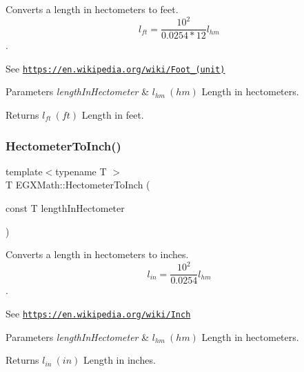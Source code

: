 Converts a length in hectometers to feet. \[ l_{ft}= \frac{10^{2}}{0.0254 * 12} l_{hm} \]. 

See \href{https://en.wikipedia.org/wiki/Foot_(unit)}{\tt https\+://en.\+wikipedia.\+org/wiki/\+Foot\+\_\+(unit)} 
\begin{DoxyParams}{Parameters}
{\em length\+In\+Hectometer} & $ l_{hm}\ (hm)$ Length in hectometers. \\
\hline
\end{DoxyParams}
\begin{DoxyReturn}{Returns}
$ l_{ft}\ (ft)$ Length in feet. 
\end{DoxyReturn}
\mbox{\label{group___e_g_x_math-_conversions-_length_conversions-_hectometer-_imperial_ga21fd4a7228c229b0b229fd0fab224998}} 
\subsubsection{\texorpdfstring{Hectometer\+To\+Inch()}{HectometerToInch()}}
{\footnotesize\ttfamily template$<$typename T $>$ \\
T E\+G\+X\+Math\+::\+Hectometer\+To\+Inch (\begin{DoxyParamCaption}\item[{const T}]{length\+In\+Hectometer }\end{DoxyParamCaption})}



Converts a length in hectometers to inches. \[ l_{in}= \frac{10^{2}}{0.0254} l_{hm} \]. 

See \href{https://en.wikipedia.org/wiki/Inch}{\tt https\+://en.\+wikipedia.\+org/wiki/\+Inch} 
\begin{DoxyParams}{Parameters}
{\em length\+In\+Hectometer} & $ l_{hm}\ (hm)$ Length in hectometers. \\
\hline
\end{DoxyParams}
\begin{DoxyReturn}{Returns}
$ l_{in}\ (in)$ Length in inches. 
\end{DoxyReturn}
\mbox{\label{group___e_g_x_math-_conversions-_length_conversions-_hectometer-_imperial_ga117bf04e7f132a33598fa098a8b7c17e}} 
